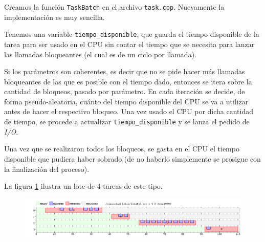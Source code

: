 Creamos  la función \texttt{TaskBatch} en el archivo \texttt{task.cpp}. Nuevamente la implementación es muy sencilla.

Tenemos una variable \texttt{tiempo\_disponible}, que guarda el tiempo disponible de la tarea para ser usado en el CPU sin contar el tiempo que se necesita para lanzar las llamadas bloqueantes (el cual es de un ciclo por llamada).

Si los parámetros son coherentes, es decir que no se pide hacer más llamadas bloqueantes de las que es posible con el tiempo dado, entonces se itera sobre la cantidad de bloqueos, pasado por parámetro. En cada iteración se decide, de forma pseudo-aleatoria, cuánto del tiempo disponible del CPU se va a utilizar antes de hacer el respectivo bloqueo. Una vez usado el CPU por dicha cantidad de tiempo, se procede a actualizar \texttt{tiempo\_disponible} y se lanza el pedido de \emph{I/O}.

Una vez que se realizaron todos los bloqueos, se gasta en el CPU el tiempo disponible que pudiera haber sobrado (de no haberlo simplemente se prosigue con la finalización del proceso).

La figura \ref{fig:ej3} ilustra un lote de 4 tareas de este tipo.

\begin{figure}[H]
  \centering
  \includegraphics[width=1\textwidth]{img/imgEj3}
  \caption{}
  \label{fig:ej3}
\end{figure}
